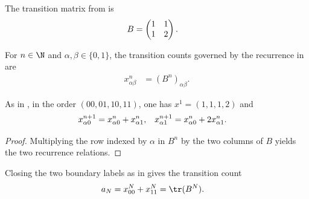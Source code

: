 \begin{definition}
    \label{def:cpsv_fibonacci_transition_matrix}
    \leanok
    The transition matrix from
    \cite[Appendix~D, lines~2146--2149]{Cirac2016MPDO_arXiv} is
    \begin{align}
        B & =\begin{pmatrix}1&1\\1&2\end{pmatrix}.
        \notag
    \end{align}
\end{definition}

\begin{definition}
    \label{def:cpsv_fibonacci_boundary_counts}
    \leanok
    For $n\in\N$ and $\alpha,\beta\in\{0,1\}$, the transition counts governed
    by the recurrence in
    \cite[Appendix~D, lines~2131--2149]{Cirac2016MPDO_arXiv} are
    \begin{align}
        x^n_{\alpha\beta} & =(B^n)_{\alpha\beta}.
        \label{eq:cpsv_fib_counts}
    \end{align}
\end{definition}

\begin{lemma}
    \label{thm:cpsv_fibonacci_boundary_recurrence}
    \leanok
    As in \cite[Appendix~D, lines~2131--2145]{Cirac2016MPDO_arXiv}, in the
    order $(00,01,10,11)$, one has $x^1=(1,1,1,2)$ and
    \begin{align}
        x^{n+1}_{\alpha0} & =x^n_{\alpha0}+x^n_{\alpha1},  &
        x^{n+1}_{\alpha1} & =x^n_{\alpha0}+2x^n_{\alpha1}.
        \notag
    \end{align}
\end{lemma}

\begin{proof}
    \leanok
    Multiplying the row indexed by $\alpha$ in $B^n$ by the two columns of $B$
    yields the two recurrence relations.
\end{proof}

\begin{definition}
    \label{def:cpsv_fibonacci_periodic_count}
    \leanok
    Closing the two boundary labels as in
    \cite[Appendix~D, line~2157]{Cirac2016MPDO_arXiv} gives the transition count
    \begin{align}
        a_N & =x^N_{00}+x^N_{11}=\tr(B^N).
        \notag
    \end{align}
\end{definition}

